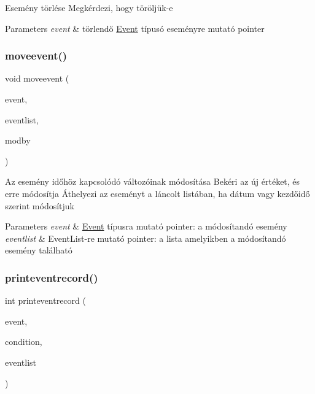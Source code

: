 Esemény törlése Megkérdezi, hogy töröljük-\/e 
\begin{DoxyParams}{Parameters}
{\em event} & törlendő \hyperlink{struct_event}{Event} típusó eseményre mutató pointer \\
\hline
\end{DoxyParams}
\mbox{\label{group___esem_xC3_xA9nyek_ga610dc34a1e251a16311ca7ac15f64e05}} 
\subsubsection{\texorpdfstring{moveevent()}{moveevent()}}
{\footnotesize\ttfamily void moveevent (\begin{DoxyParamCaption}\item[{\hyperlink{struct_event}{Event} $\ast$}]{event,  }\item[{\hyperlink{struct_event_list}{Event\+List} const $\ast$}]{eventlist,  }\item[{\hyperlink{group___esem_xC3_xA9nyek_ga643f8b09cbc45afc4ad36b27c077b1fd}{Mod\+By}}]{modby }\end{DoxyParamCaption})}

Az esemény időhöz kapcsolódó változóinak módosítása Bekéri az új értéket, és erre módosítja Áthelyezi az eseményt a láncolt listában, ha dátum vagy kezdőidő szerint módosítjuk 
\begin{DoxyParams}{Parameters}
{\em event} & \hyperlink{struct_event}{Event} típusra mutató pointer\+: a módosítandó esemény \\
\hline
{\em eventlist} & Event\+List-\/re mutató pointer\+: a lista amelyikben a módosítandó esemény található \\
\hline
\end{DoxyParams}
\mbox{\label{group___esem_xC3_xA9nyek_ga43a7dc247171d596d8d808776d8d40f5}} 
\subsubsection{\texorpdfstring{printeventrecord()}{printeventrecord()}}
{\footnotesize\ttfamily int printeventrecord (\begin{DoxyParamCaption}\item[{\hyperlink{struct_event}{Event} $\ast$}]{event,  }\item[{\hyperlink{struct_search_conditions}{Search\+Conditions}}]{condition,  }\item[{\hyperlink{struct_event_list}{Event\+List} $\ast$}]{eventlist }\end{DoxyParamCaption})}

